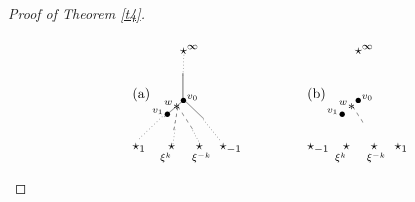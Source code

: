 \documentclass{article}
\theoremstyle{definition}
\theoremstyle{remark}
\begin{document}
\begin{proof}[Proof of Theorem \ref{t4}]
\begin{figure}
\[
\unitlength 1mm %
\linethickness{0.4pt}
\ifx\plotpoint\undefined\newsavebox{\plotpoint}\fi %
\begin{picture}(30,30)(0,12)
\put(5,27){(a)}
\put(17,38){$\star^{\infty}$}
\put(5,14){$\star_1$}
\put(12,12){${}_{\xi^k}$}\put(14,14){$\star$}
\put(21,14){$\star$}\put(20,12){${}_{\xi^{-k}}$}
\put(27,14){$\star_{-1}$}
\put(17,25.5){$\bullet^{v_0}$}
\put(13,24){${}^w*$}
\put(10,22){${}^{v_1}\bullet$}
\multiput(16.43,24.93)(.0334821,-.0513393){16}{\line(0,-1){.0513393}}
\multiput(17.501,23.287)(.0334821,-.0513393){16}{\line(0,-1){.0513393}}
\multiput(18.573,21.644)(.0334821,-.0513393){16}{\line(0,-1){.0513393}}
\multiput(19.644,20.001)(.0334821,-.0513393){16}{\line(0,-1){.0513393}}
\multiput(16.43,24.68)(-.028571,-.164286){5}{\line(0,-1){.164286}}
\multiput(16.144,23.037)(-.028571,-.164286){5}{\line(0,-1){.164286}}
\multiput(15.858,21.394)(-.028571,-.164286){5}{\line(0,-1){.164286}}
\multiput(15.573,19.751)(-.028571,-.164286){5}{\line(0,-1){.164286}}
\multiput(13,22.25)(.03968254,.033730159){126}{\line(1,0){.03968254}}
\multiput(18,26.5)(.035460993,-.033687943){141}{\line(1,0){.035460993}}
\put(17.75,26.25){\line(0,1){7}}
\multiput(17.68,32.68)(.04167,.83333){7}{{\rule{.4pt}{.4pt}}}
\multiput(12.43,22.18)(-.63889,-.61111){10}{{\rule{.4pt}{.4pt}}}
\multiput(15.68,18.93)(-.125,-.875){5}{{\rule{.4pt}{.4pt}}}
\multiput(20.18,18.68)(.35,-.65){6}{{\rule{.4pt}{.4pt}}}
\multiput(22.93,21.43)(.5,-.625){9}{{\rule{.4pt}{.4pt}}}
\end{picture}
\qquad\qquad
\unitlength 1mm %
\linethickness{0.4pt}
\ifx\plotpoint\undefined\newsavebox{\plotpoint}\fi %
\begin{picture}(30,30)(0,12)
\put(5,27){(b)}
\put(17,38){$\star^{\infty}$}
\put(5,14){$\star_{-1}$}
\put(12,12){${}_{\xi^k}$}\put(14,14){$\star$}
\put(21,14){$\star$}\put(20,12){${}_{\xi^{-k}}$}
\put(27,14){$\star_1$}
\put(17,25.5){$\bullet^{v_0}$}
\put(13,24){${}^w*$}
\put(10,22){${}^{v_1}\bullet$}
\multiput(16.43,24.93)(.0334821,-.0513393){16}{\line(0,-1){.0513393}}
\multiput(17.501,23.287)(.0334821,-.0513393){16}{\line(0,-1){.0513393}}
\multiput(18.573,21.644)(.0334821,-.0513393){16}{\line(0,-1){.0513393}}

\end{picture}\]
\end{figure}
\end{proof}
\end{document}
